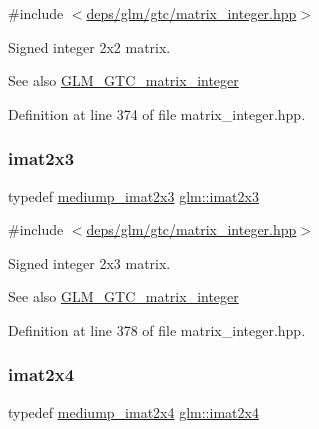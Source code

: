 {\ttfamily \#include $<$\hyperlink{matrix__integer_8hpp}{deps/glm/gtc/matrix\+\_\+integer.\+hpp}$>$}

Signed integer 2x2 matrix. \begin{DoxySeeAlso}{See also}
\hyperlink{group__gtc__matrix__integer}{G\+L\+M\+\_\+\+G\+T\+C\+\_\+matrix\+\_\+integer} 
\end{DoxySeeAlso}


Definition at line 374 of file matrix\+\_\+integer.\+hpp.

\mbox{\label{group__gtc__matrix__integer_ga143bc5177bac9991d84b70da03952516}} 
\subsubsection{\texorpdfstring{imat2x3}{imat2x3}}
{\footnotesize\ttfamily typedef \hyperlink{group__gtc__matrix__integer_ga1e2d944bde5dfe9fe49824c4c3457e30}{mediump\+\_\+imat2x3} \hyperlink{group__gtc__matrix__integer_ga143bc5177bac9991d84b70da03952516}{glm\+::imat2x3}}



{\ttfamily \#include $<$\hyperlink{matrix__integer_8hpp}{deps/glm/gtc/matrix\+\_\+integer.\+hpp}$>$}

Signed integer 2x3 matrix. \begin{DoxySeeAlso}{See also}
\hyperlink{group__gtc__matrix__integer}{G\+L\+M\+\_\+\+G\+T\+C\+\_\+matrix\+\_\+integer} 
\end{DoxySeeAlso}


Definition at line 378 of file matrix\+\_\+integer.\+hpp.

\mbox{\label{group__gtc__matrix__integer_gafe2d058e164fd1badace451ffcf4ae46}} 
\subsubsection{\texorpdfstring{imat2x4}{imat2x4}}
{\footnotesize\ttfamily typedef \hyperlink{group__gtc__matrix__integer_gabc256c695f6fe794f809f2d1ee667d6e}{mediump\+\_\+imat2x4} \hyperlink{group__gtc__matrix__integer_gafe2d058e164fd1badace451ffcf4ae46}{glm\+::imat2x4}}



